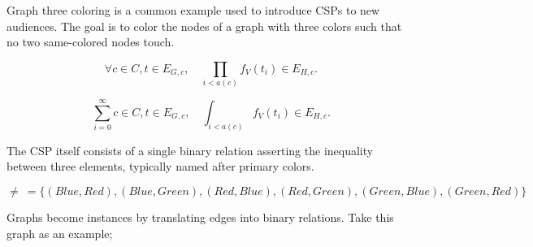 \begin{comment}
    
\begin{betterpython}
    def even_constraint(last_state, next_state_var, solver):
        n = solver.IntVar(0, solver.infinity(), 'n_even')
        b = solver.BoolVar('b_even')
        solver.Add(next_state_var - 2 * n <= M * (1 - b))
        solver.Add(next_state_var - 2 * n >= -M * (1 - b))
        return [(b, 1)]
\end{betterpython}

\begin{lstlisting}{python}
    def odd_constraint(last_state, next_state_var, solver):
        n = solver.IntVar(0, solver.infinity(), 'n_odd')
        b = solver.BoolVar('b_odd')
        solver.Add(next_state_var - 2 * n - 1 <= M * (1 - b))
        solver.Add(next_state_var - 2 * n - 1 >= -M * (1 - b))
        return [(b, 1)]
\end{lstlisting}

\end{comment}
Graph three coloring is a common example used to introduce CSPs to new audiences. The goal is to color the nodes of a graph with three colors such that no two same-colored nodes touch. 

\begin{equation}
    \forall c \in C, t \in E_{G, c}, \quad \prod_{i<a(c)} f_V(t_i) \in E_{H, c}.    
\end{equation}


\begin{equation}
    \sum_{i=0}^\infty c \in C, t \in E_{G, c}, \quad \int_{i<a(c)} f_V(t_i) \in E_{H, c}.    
\end{equation}

The CSP itself consists of a single binary relation asserting the inequality between three elements, typically named after primary colors.

\begin{equation}\label{equation:three-color-neq-def}
    \neq\ = \{ (\mathit{Blue}, \mathit{Red}), (\mathit{Blue}, \mathit{Green}), (\mathit{Red}, \mathit{Blue}), (\mathit{Red}, \mathit{Green}), (\mathit{Green}, \mathit{Blue}), (\mathit{Green}, \mathit{Red}) \}
\end{equation}

Graphs become instances by translating edges into binary relations. Take this graph as an example;

\begin{center}
\end{center}

